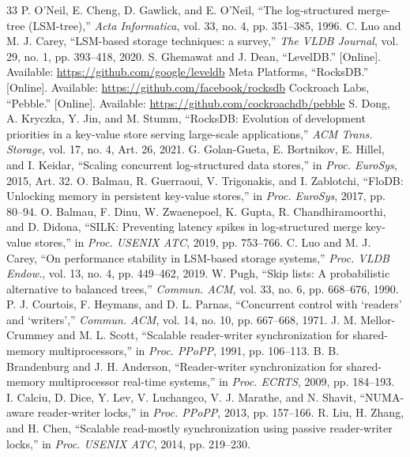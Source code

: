 \documentclass[conference]{IEEEtran}
\begin{document}
\begin{thebibliography}{33}
 P. O'Neil, E. Cheng, D. Gawlick, and E. O'Neil, ``The log-structured merge-tree (LSM-tree),'' \emph{Acta Informatica}, vol. 33, no. 4, pp. 351--385, 1996.
 C. Luo and M. J. Carey, ``LSM-based storage techniques: a survey,'' \emph{The VLDB Journal}, vol. 29, no. 1, pp. 393--418, 2020.
 S. Ghemawat and J. Dean, ``LevelDB.'' [Online]. Available: \url{https://github.com/google/leveldb}
 Meta Platforms, ``RocksDB.'' [Online]. Available: \url{https://github.com/facebook/rocksdb}
 Cockroach Labs, ``Pebble.'' [Online]. Available: \url{https://github.com/cockroachdb/pebble}
 S. Dong, A. Kryczka, Y. Jin, and M. Stumm, ``RocksDB: Evolution of development priorities in a key-value store serving large-scale applications,'' \emph{ACM Trans. Storage}, vol. 17, no. 4, Art. 26, 2021.
 G. Golan-Gueta, E. Bortnikov, E. Hillel, and I. Keidar, ``Scaling concurrent log-structured data stores,'' in \emph{Proc. EuroSys}, 2015, Art. 32.
 O. Balmau, R. Guerraoui, V. Trigonakis, and I. Zablotchi, ``FloDB: Unlocking memory in persistent key-value stores,'' in \emph{Proc. EuroSys}, 2017, pp. 80--94.
 O. Balmau, F. Dinu, W. Zwaenepoel, K. Gupta, R. Chandhiramoorthi, and D. Didona, ``SILK: Preventing latency spikes in log-structured merge key-value stores,'' in \emph{Proc. USENIX ATC}, 2019, pp. 753--766.
 C. Luo and M. J. Carey, ``On performance stability in LSM-based storage systems,'' \emph{Proc. VLDB Endow.}, vol. 13, no. 4, pp. 449--462, 2019.
 W. Pugh, ``Skip lists: A probabilistic alternative to balanced trees,'' \emph{Commun. ACM}, vol. 33, no. 6, pp. 668--676, 1990.
 P. J. Courtois, F. Heymans, and D. L. Parnas, ``Concurrent control with `readers' and `writers','' \emph{Commun. ACM}, vol. 14, no. 10, pp. 667--668, 1971.
 J. M. Mellor-Crummey and M. L. Scott, ``Scalable reader-writer synchronization for shared-memory multiprocessors,'' in \emph{Proc. PPoPP}, 1991, pp. 106--113.
 B. B. Brandenburg and J. H. Anderson, ``Reader-writer synchronization for shared-memory multiprocessor real-time systems,'' in \emph{Proc. ECRTS}, 2009, pp. 184--193.
 I. Calciu, D. Dice, Y. Lev, V. Luchangco, V. J. Marathe, and N. Shavit, ``NUMA-aware reader-writer locks,'' in \emph{Proc. PPoPP}, 2013, pp. 157--166.
 R. Liu, H. Zhang, and H. Chen, ``Scalable read-mostly synchronization using passive reader-writer locks,'' in \emph{Proc. USENIX ATC}, 2014, pp. 219--230.

\end{thebibliography}
\end{document}
